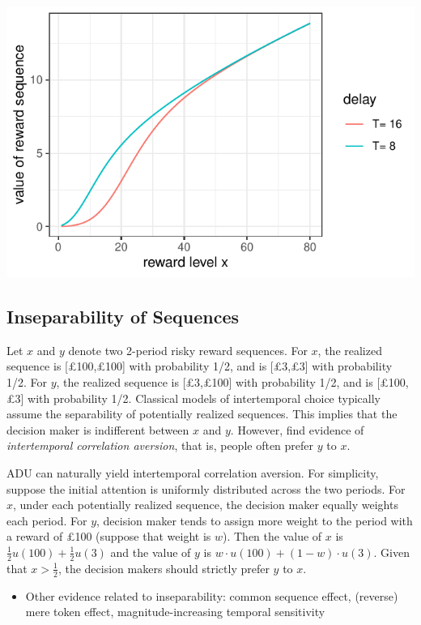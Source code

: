 \documentclass[
  12pt,
]{article}
\providecommand{\tightlist}{%
  \setlength{\itemsep}{0pt}\setlength{\parskip}{0pt}}
\begin{document}
\includegraphics{images/S_shaped_value.pdf}

\hypertarget{inseparability-of-sequences}{%
\subsection{Inseparability of
Sequences}\label{inseparability-of-sequences}}

Let \(x\) and \(y\) denote two 2-period risky reward sequences. For
\(x\), the realized sequence is {[}£100,£100{]} with probability 1/2,
and is {[}£3,£3{]} with probability 1/2. For \(y\), the realized
sequence is {[}£3,£100{]} with probability 1/2, and is {[}£100,£3{]}
with probability 1/2. Classical models of intertemporal choice typically
assume the separability of potentially realized sequences. This implies
that the decision maker is indifferent between \(x\) and \(y\). However,
\citet{andersen_multiattribute_2018} find evidence of
\emph{intertemporal correlation aversion}, that is, people often prefer
\(y\) to \(x\).

ADU can naturally yield intertemporal correlation aversion. For
simplicity, suppose the initial attention is uniformly distributed
across the two periods. For \(x\), under each potentially realized
sequence, the decision maker equally weights each period. For \(y\),
decision maker tends to assign more weight to the period with a reward
of £100 (suppose that weight is \(w\)). Then the value of \(x\) is
\(\frac{1}{2} u(100) + \frac{1}{2} u(3)\) and the value of \(y\) is
\(w\cdot u(100) +(1-w) \cdot u(3)\). Given that \(x>\frac{1}{2}\), the
decision makers should strictly prefer \(y\) to \(x\).

\begin{itemize}
\tightlist
\item
  Other evidence related to inseparability: common sequence effect,
  (reverse) mere token effect, magnitude-increasing temporal sensitivity
\end{itemize}
\end{document}
